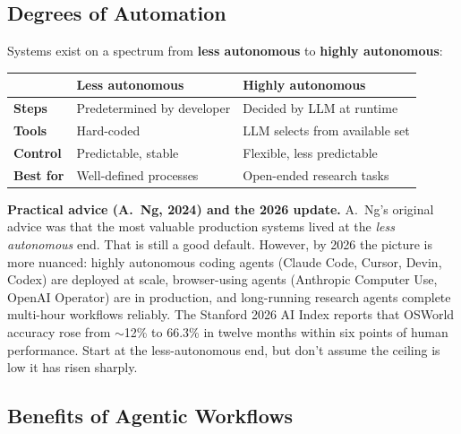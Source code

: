 \documentclass[a4paper,11pt]{article}
\begin{document}
\subsection{Degrees of Automation}

Systems exist on a spectrum from \textbf{less autonomous} to
\textbf{highly autonomous}:

\begin{center}\small
\begin{tabular}{p{3.2cm} p{4.8cm} p{4.8cm}}
  \toprule
   & \textbf{Less autonomous} & \textbf{Highly autonomous} \\
  \midrule
  \textbf{Steps}   & Predetermined by developer & Decided by LLM at runtime \\
  \textbf{Tools}   & Hard-coded                & LLM selects from available set \\
  \textbf{Control} & Predictable, stable        & Flexible, less predictable \\
  \textbf{Best for}& Well-defined processes     & Open-ended research tasks \\
  \bottomrule
\end{tabular}
\end{center}

\begin{ambercallout}
\textbf{Practical advice (A.\ Ng, 2024) and the 2026 update.}
A.\ Ng's original advice was that the most valuable production
systems lived at the \textit{less autonomous} end. That is still a
good default. However, by 2026 the picture is more nuanced: highly
autonomous coding agents (Claude Code, Cursor, Devin, Codex) are
deployed at scale, browser-using agents (Anthropic Computer Use,
OpenAI Operator) are in production, and long-running research agents
complete multi-hour workflows reliably. The Stanford 2026 AI Index
reports that OSWorld accuracy rose from $\sim$12\% to 66.3\% in
twelve months \textemdash{} within six points of human performance.
Start at the less-autonomous end, but don't assume the ceiling is low
\textemdash{} it has risen sharply.
\end{ambercallout}

\subsection{Benefits of Agentic Workflows}
\end{document}
